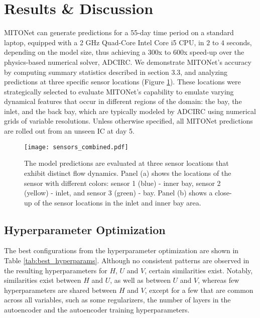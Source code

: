 \documentclass[draft]{agujournal2019}
\begin{document}
\section{Results \& Discussion}

MITONet can generate predictions for a 55-day time period on a standard laptop, equipped with a 2 GHz Quad-Core Intel Core i5 CPU, in $2$ to $4$ seconds, depending on the model size, thus achieving a 300x to 600x speed-up over the physics-based numerical solver, ADCIRC. We demonstrate MITONet's accuracy by computing summary statistics described in section 3.3, and analyzing predictions at three specific sensor locations (Figure \ref{fig:sensors}). These locations were strategically selected to evaluate MITONet's capability to emulate varying dynamical features that occur in different regions of the domain: the bay, the inlet, and the back bay, which are typically modeled by ADCIRC using numerical grids of variable resolutions. Unless otherwise specified, all MITONet predictions are rolled out from an unseen IC at day 5.

\begin{figure}[h]
    \centering
    \texttt{[image: sensors\_combined.pdf]}
    \caption{The model predictions are evaluated at three sensor locations that exhibit distinct flow dynamics. Panel (a) shows the locations of the sensor with different colors: sensor 1 (blue) - inner bay, sensor 2 (yellow) - inlet, and sensor 3 (green) - bay. Panel (b) shows a close-up of the sensor locations in the inlet and inner bay area.}
    \label{fig:sensors}
\end{figure}

\subsection{Hyperparameter Optimization}

The best configurations from the  hyperparameter optimization are shown in Table \ref{tab:best_hyperparams}. Although no consistent patterns are observed in the resulting hyperparameters for $H$, $U$ and $V$, certain similarities exist.  Notably, similarities exist between $H$ and $U$, as well as between $U$ and $V$, whereas few hyperparameters are shared between $H$ and $V$, except for a few that are common across all variables, such as some regularizers, the number of layers in the autoencoder and the autoencoder training hyperparameters.
\end{document}
